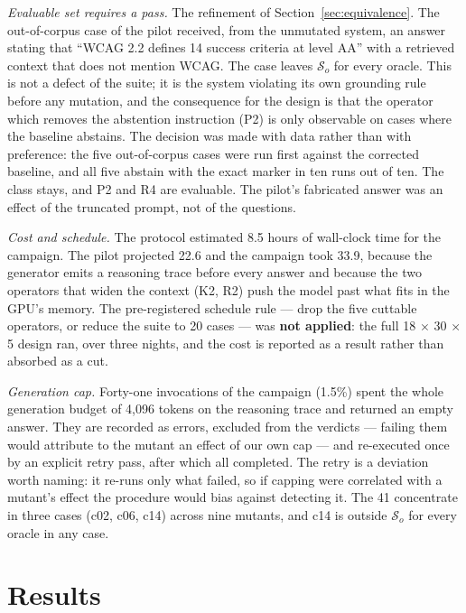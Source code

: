 \documentclass[a4paper,fleqn]{cas-dc}
\newcommand{\Sset}{\mathcal{S}}
\begin{document}
\emph{Evaluable set requires a pass.} The refinement of
Section~\ref{sec:equivalence}. The out-of-corpus case of the pilot received,
from the unmutated system, an answer stating that ``WCAG 2.2 defines 14
success criteria at level AA'' with a retrieved context that does not mention
WCAG. The case leaves $\Sset_o$ for every oracle. This is not a defect of the
suite; it is the system violating its own grounding rule before any mutation,
and the consequence for the design is that the operator which removes the
abstention instruction (P2) is only observable on cases where the baseline
abstains. The decision was made with data rather than with preference: the
five out-of-corpus cases were run first against the corrected baseline, and all
five abstain with the exact marker in ten runs out of ten. The class stays, and
P2 and R4 are evaluable. The pilot's fabricated answer was an effect of the
truncated prompt, not of the questions.

\emph{Cost and schedule.} The protocol estimated 8.5 hours of wall-clock
time for the campaign. The pilot projected 22.6 and the campaign took 33.9,
because the generator emits a reasoning trace before every answer and because
the two operators that widen the context (K2, R2) push the model past what
fits in the GPU's memory. The pre-registered schedule rule --- drop the five
cuttable operators, or reduce the suite to 20 cases --- was \textbf{not
applied}: the full 18 $\times$ 30 $\times$ 5 design ran, over three nights,
and the cost is reported as a result rather than absorbed as a cut.

\emph{Generation cap.} Forty-one invocations of the campaign (1.5\%) spent
the whole generation budget of 4,096 tokens on the reasoning trace and returned
an empty answer. They are recorded as errors, excluded from the verdicts ---
failing them would attribute to the mutant an effect of our own cap --- and
re-executed once by an explicit retry pass, after which all completed. The
retry is a deviation worth naming: it re-runs only what failed, so if capping
were correlated with a mutant's effect the procedure would bias against
detecting it. The 41 concentrate in three cases (c02, c06, c14) across nine
mutants, and c14 is outside $\Sset_o$ for every oracle in any case.

\section{Results}
\label{sec:results}
\end{document}
